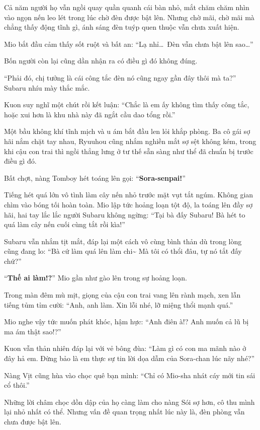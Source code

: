 \documentclass[../main.tex]{subfiles}
\begin{document}
\ct

Cả năm người họ vẫn ngồi quay quần quanh cái bàn nhỏ, mắt chăm chăm nhìn vào ngọn nến leo lét trong lúc chờ đèn được bật lên. Nhưng chờ mãi, chờ mãi mà chẳng thấy động tĩnh gì, ánh sáng đèn tuýp quen thuộc vẫn chưa xuất hiện.

Mio bắt đầu cảm thấy sốt ruột và bất an: ``Lạ nhỉ\dots\ Đèn vẫn chưa bật lên sao\dots''

Bốn người còn lại cũng dần nhận ra có điều gì đó không đúng.

``Phải đó, chị tưởng là cái công tắc đèn nó cũng ngay gần đây thôi mà ta?'' Subaru nhíu mày thắc mắc.

Kuon suy nghĩ một chút rồi kết luận: ``Chắc là em ấy không tìm thấy công tắc, hoặc xui hơn là khu nhà này đã ngắt cầu dao tổng rồi.''

Một bầu không khí tĩnh mịch và u ám bắt đầu len lỏi khắp phòng. Ba cô gái sợ hãi nắm chặt tay nhau, Ryuuhou cũng nhắm nghiền mắt  sợ sệt không kém, trong khi cậu con trai thì ngồi thẳng lưng ở tư thế sẵn sàng như thể đã chuẩn bị trước điều gì đó.

Bất chợt, nàng Tomboy hét toáng lên gọi: ``\textbf{Sora-senpai!}''

Tiếng hét quá lớn vô tình làm cây nến nhỏ trước mặt vụt tắt ngúm. Không gian chìm vào bóng tối hoàn toàn. Mio lập tức hoảng loạn tột độ, la toáng lên đầy sợ hãi, hai tay lắc lắc người Subaru không ngừng: ``Tại bà đấy Subaru! Bà hét to quá làm cây nến cuối cùng tắt rồi kìa!''


Subaru vẫn nhắm tịt mắt, đáp lại một cách vô cùng bình thản dù trong lòng cũng đang lo: ``Bà cứ làm quá lên làm chi\~{} Mà tôi có thổi đâu, tự nó tắt đấy chứ?''

``\textbf{Thế ai làm!?}'' Mio gần như gào lên trong sự hoảng loạn.

Trong màn đêm mù mịt, giọng của cậu con trai vang lên rành mạch, xen lẫn tiếng tủm tỉm cười: ``Anh, anh làm. Xin lỗi nhé, lỡ miệng thổi mạnh quá.''

Mio nghe vậy tức muốn phát khóc, hậm hực: ``Anh điên à!? Anh muốn cả lũ bị ma ám thật sao!?''

Kuon vẫn thản nhiên đáp lại với vẻ bông đùa: ``Làm gì có con ma mãnh nào ở đây hả em. Đừng bảo là em thực sự tin lời dọa dẫm của Sora-chan lúc nãy nhé?''

Nàng Vịt cũng hùa vào chọc quê bạn mình: ``Chỉ có Mio-sha nhát cáy mới tin sái cổ thôi.''

Những lời châm chọc dồn dập của họ càng làm cho nàng Sói sợ hơn, cô thu mình lại nhỏ nhất có thể. Nhưng vấn đề quan trọng nhất lúc này là, đèn phòng vẫn chưa được bật lên.
\end{document}
